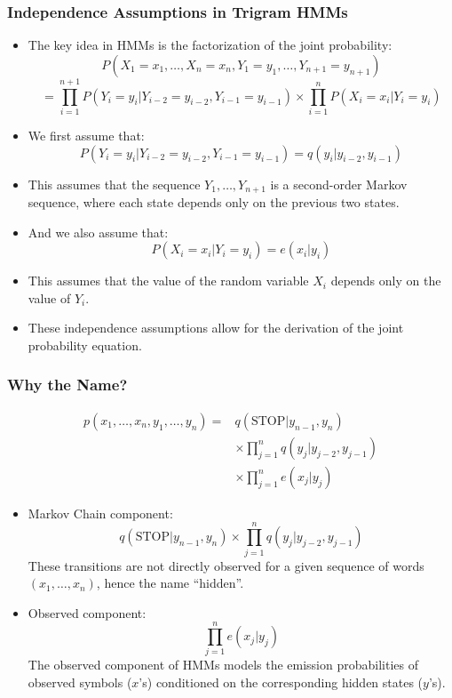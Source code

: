 \documentclass[handout]{beamer}
\begin{document}
\begin{frame}
\frametitle{Independence Assumptions in Trigram HMMs}
\scriptsize

\begin{itemize}
    
    \item The key idea in HMMs is the factorization of the joint probability:
    \[P(X_1 = x_1, \ldots, X_n = x_n, Y_1 = y_1, \ldots, Y_{n+1} = y_{n+1})\]
    \[= \prod_{i=1}^{n+1} P(Y_i = y_i | Y_{i-2} = y_{i-2}, Y_{i-1} = y_{i-1}) \times \prod_{i=1}^{n} P(X_i = x_i | Y_i = y_i)\]
    
    \item We first assume that:
    \[P(Y_i = y_i | Y_{i-2} = y_{i-2}, Y_{i-1} = y_{i-1}) = q(y_i | y_{i-2}, y_{i-1})\]
    
    \item This assumes that the sequence $Y_1, \ldots, Y_{n+1}$ is a second-order Markov sequence, where each state depends only on the previous two states.
    
    \item And we also assume that:
      \[P(X_i = x_i | Y_i = y_i) = e(x_i | y_i)\]
    
  \item This assumes that the value of the random variable $X_i$ depends only on the value of $Y_i$.
    
    
    \item These independence assumptions allow for the derivation of the joint probability equation.
    

\end{itemize}

\end{frame}





\begin{frame}
  \frametitle{Why the Name?}
  \scriptsize
  \[
  \begin{aligned}
    p(x_1, \ldots, x_n, y_1, \ldots, y_n) = & q(\text{STOP}|y_{n-1}, y_n) \\
    & \times \prod_{j=1}^{n} q(y_j | y_{j-2}, y_{j-1}) \\
    & \times \prod_{j=1}^{n} e(x_j | y_j)
  \end{aligned}
  \]
  \begin{itemize}
    \item Markov Chain component:
    \[
    q(\text{STOP}|y_{n-1}, y_n)\times \prod_{j=1}^{n} q(y_j | y_{j-2}, y_{j-1})
    \]
These transitions are not directly observed for a given sequence of words $(x_1, \ldots, x_n)$, hence the name ``hidden''.

    \item Observed component:
    \[
    \prod_{j=1}^{n} e(x_j | y_j)
    \]
    The observed component of HMMs models the emission probabilities of observed symbols ($x$'s) conditioned on the corresponding hidden states ($y$'s).
  \end{itemize}
\end{frame}
\end{document}
